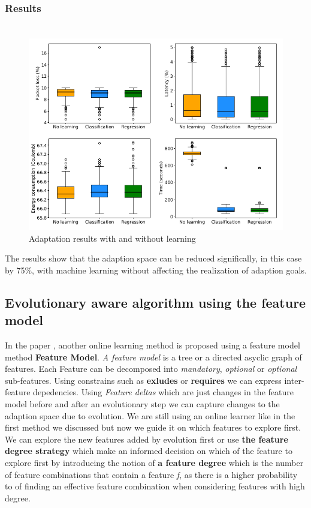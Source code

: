 \documentclass[pdftex,english,oribibl]{llncs}
\begin{document}
\subsubsection{Results\\\\} 
\begin{figure}[H]
\centering
	\includegraphics[totalheight=8cm]{figures/resultsMLearner}
    \caption{Adaptation results with and without learning \citep{efficientAnalysisAdaptionSpaces}}
    \label{fig:resultsMLearner}
\end{figure}
The results show that the adaption space can be reduced  significally, in this case by 75\%, with machine learning
without affecting the realization of adaption goals.

\subsection{Evolutionary aware algorithm using the feature model}
In the paper \cite{featureModelGuidedLearning}, another online learning method is proposed using a feature model method \textbf{Feature Model}. 
\textit{A feature model} is a tree or a directed asyclic graph of features. Each Feature can be decomposed into
\textit{mandatory}, \textit{optional} or \textit{optional} sub-features. Using constrains such as \textbf{exludes}
or \textbf{requires} we can express inter-feature depedencies. Using \textit{Feature deltas} which are just changes 
in the feature model before and after an evolutionary step we can capture changes to the adaption space due to evolution. We are still using an online learner like in the first method we discussed but now we guide it on which features to explore first. We can explore the new features added by evolution first or use \textbf{the feature degree strategy} which make an informed decision on which of the feature to explore first by introducing the notion of \textbf{a feature degree} which is the number of feature combinations that contain a feature \textit{f}, as there is a higher probability to of finding an effective feature combination when considering features with high degree.
\end{document}
